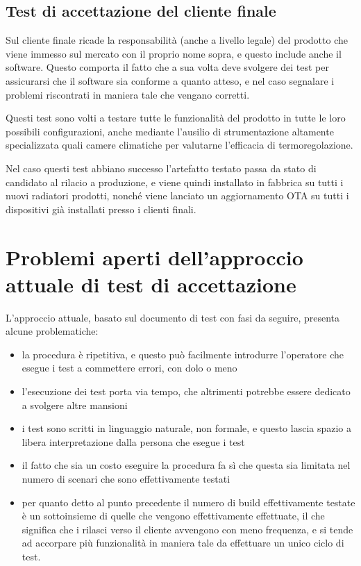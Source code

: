 \documentclass[12pt,a4paper,twoside,titlepage]{book}
\begin{document}
\subsection{Test di accettazione del cliente finale}

Sul cliente finale ricade la responsabilità (anche a livello legale) del prodotto
che viene immesso sul mercato con il proprio nome sopra, e questo include anche
il software. Questo comporta il fatto che a sua volta deve svolgere dei test per
assicurarsi che il software sia conforme a quanto atteso, e nel caso segnalare i
problemi riscontrati in maniera tale che vengano corretti.

Questi test sono volti a testare tutte le funzionalità del prodotto in tutte le loro
possibili configurazioni, anche mediante l'ausilio di strumentazione altamente
specializzata quali camere climatiche per valutarne l'efficacia di termoregolazione.

Nel caso questi test abbiano successo l'artefatto testato passa da stato di candidato
al rilacio a produzione, e viene quindi installato in fabbrica su tutti i nuovi radiatori
prodotti, nonché viene lanciato un aggiornamento OTA su tutti i dispositivi già installati
presso i clienti finali.

\section{Problemi aperti dell'approccio attuale di test di accettazione}

L'approccio attuale, basato sul documento di test con fasi da seguire, presenta
alcune problematiche:
\begin{itemize}
    \item la procedura è ripetitiva, e questo può facilmente introdurre
        l'operatore che esegue i test a commettere errori, con dolo o meno
    \item l'esecuzione dei test porta via tempo, che altrimenti potrebbe essere dedicato 
        a svolgere altre mansioni
    \item i test sono scritti in linguaggio naturale, non formale, e questo lascia spazio 
        a libera interpretazione dalla persona che esegue i test
    \item il fatto che sia un costo eseguire la procedura fa sì che questa sia
        limitata nel numero di scenari che sono effettivamente testati
    \item per quanto detto al punto precedente il numero di build effettivamente testate 
        è un sottoinsieme di quelle che vengono effettivamente effettuate, il che significa che 
        i rilasci verso il cliente avvengono con meno frequenza, e si tende ad accorpare 
        più funzionalità in maniera tale da effettuare un unico ciclo di test. 
\end{itemize}
\end{document}
